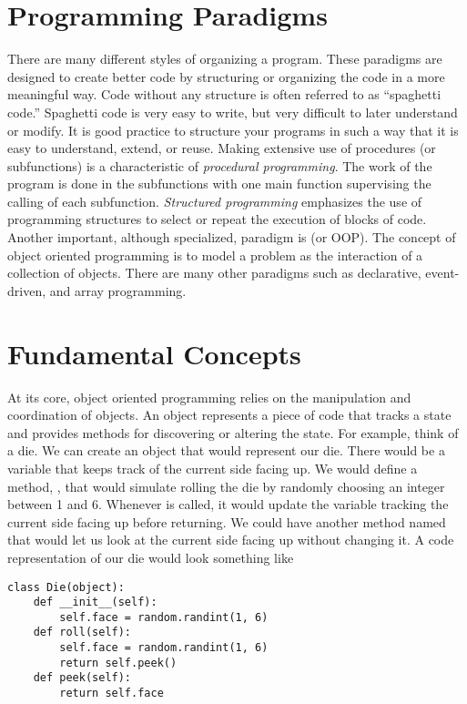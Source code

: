 \label{lab:OOP}

\section*{Programming Paradigms}
There are many different styles of organizing a program.  
These paradigms are designed to create better code by structuring or organizing the code in a more meaningful way.
Code without any structure is often referred to as ``spaghetti code.''
Spaghetti code is very easy to write, but very difficult to later understand or modify.
It is good practice to structure your programs in such a way that it is easy to understand, extend, or reuse.
Making extensive use of procedures (or subfunctions) is a characteristic of \emph{procedural programming}.
The work of the program is done in the subfunctions with one main function supervising the calling of each subfunction.
\emph{Structured programming} emphasizes the use of programming structures to select or repeat the execution of blocks of code.
Another important, although specialized, paradigm is  (or OOP).
The concept of object oriented programming is to model a problem as the interaction of a collection of objects.
There are many other paradigms such as declarative, event-driven, and array programming.

\section*{Fundamental Concepts}
At its core, object oriented programming relies on the manipulation and coordination of objects.
An object represents a piece of code that tracks a state and provides methods for discovering or altering the state.
For example, think of a die.
We can create an object that would represent our die.
There would be a variable that keeps track of the current side facing up.
We would define a method, , that would simulate rolling the die by randomly choosing an integer between 1 and 6.
Whenever  is called, it would update the variable tracking the current side facing up before returning.
We could have another method named  that would let us look at the current side facing up without changing it.
A code representation of our die would look something like
\begin{lstlisting}
class Die(object):
    def __init__(self):
        self.face = random.randint(1, 6)
    def roll(self):
        self.face = random.randint(1, 6)
        return self.peek()
    def peek(self):
        return self.face
\end{lstlisting}

